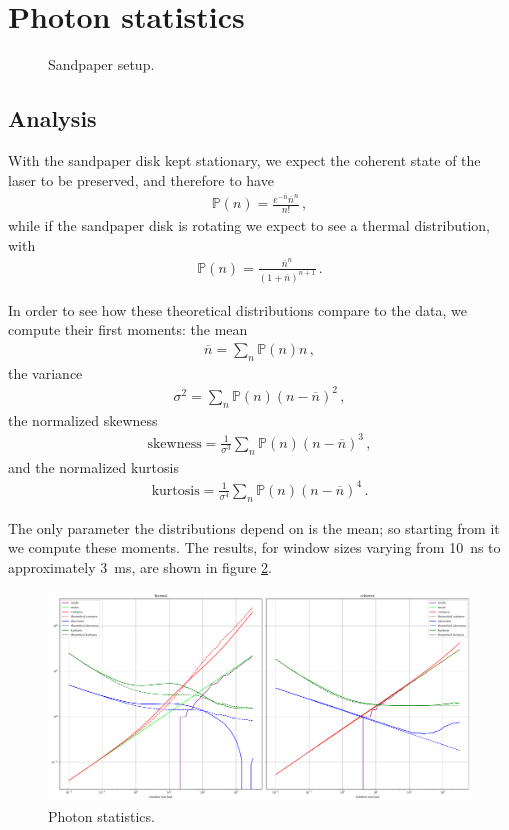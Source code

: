 \documentclass[main.tex]{subfiles}
\begin{document}
\section{Photon statistics}


\begin{figure}[ht]
\centering

\caption{Sandpaper setup.}
\label{fig:sandpaper}
\end{figure}    

\subsection{Analysis}

With the sandpaper disk kept stationary, we expect the coherent state of the laser to be preserved, and therefore to have 
%
\begin{align}
\mathbb{P} (n) = \frac{e^{-\overline{n}} \overline{n}^{n}}{n!}
\,,
\end{align}
%
while if the sandpaper disk is rotating we expect to see a thermal distribution, with 
%
\begin{align}
\mathbb{P} (n) = \frac{\overline{n}^{n}}{(1 + \overline{n})^{n+1}}
\,.
\end{align}

In order to see how these theoretical distributions compare to the data, we compute their first moments: the mean 
%
\begin{align}
\overline{n} = \sum _{n} \mathbb{P}(n) n
\,,
\end{align}
%
the variance 
%
\begin{align}
\sigma^2 = \sum _{n} \mathbb{P}(n) (n - \overline{n})^2
\,,
\end{align}
%
the normalized skewness 
%
\begin{align}
\text{skewness} = \frac{1}{\sigma^3} \sum _{n} \mathbb{P}(n) (n - \overline{n})^3
\,,
\end{align}
%
and the normalized kurtosis 
%
\begin{align}
\text{kurtosis} = \frac{1}{\sigma^4} \sum _{n} \mathbb{P}(n) (n - \overline{n})^4
\,.
\end{align}

The only parameter the distributions depend on is the mean; so starting from it we compute these moments. 
The results, for window sizes varying from \SI{10}{ns} to approximately \SI{3}{ms}, are shown in figure \ref{fig:photon_statistics}.

\begin{figure}
    \includegraphics[width=\textwidth]{figures/photon_statistics.pdf}
    \caption{Photon statistics.}
    \label{fig:photon_statistics}
\end{figure}
\end{document}
